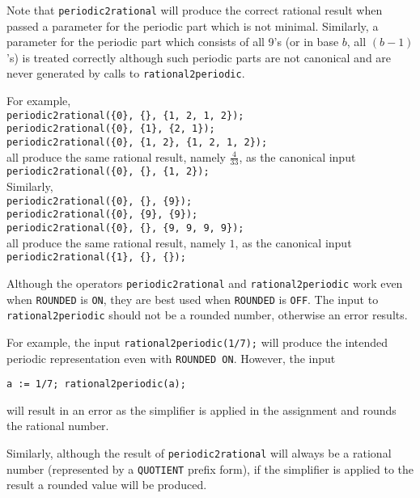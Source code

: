 \documentclass[11pt,a4paper]{article}
\begin{document}
Note that \texttt{periodic2rational} will produce the correct rational result
when passed a parameter for the periodic part which is not minimal.
Similarly, a parameter for the periodic part which consists of all 9's
(or in base $b$, all $(b-1)$'s) is treated correctly although such periodic
parts are not canonical and are never generated by calls to
\texttt{rational2periodic}.

\begin{tabbing}
For example,\\
\hspace{10mm} \= \texttt{periodic2rational(\{0\}, \{\}, \{1, 2, 1, 2\});} \\
    \> \texttt{periodic2rational(\{0\}, \{1\}, \{2, 1\});} \\
    \> \texttt{periodic2rational(\{0\}, \{1, 2\}, \{1, 2, 1, 2\});} \\[\baselineskip]
all produce the same rational result, namely $\frac{4}{33}$, as the canonical input\\
    \> \texttt{periodic2rational(\{0\}, \{\}, \{1, 2\});}\\[\baselineskip]
Similarly,\\
    \> \texttt{periodic2rational(\{0\}, \{\}, \{9\});} \\
    \> \texttt{periodic2rational(\{0\}, \{9\}, \{9\});} \\
    \> \texttt{periodic2rational(\{0\}, \{\}, \{9, 9, 9, 9\});} \\
all produce the same rational result, namely $1$, as the  canonical input\\
    \> \texttt{periodic2rational(\{1\}, \{\}, \{\});}
\end{tabbing}

Although the operators \texttt{periodic2rational} and \texttt{rational2periodic} work even when \texttt{ROUNDED} is \texttt{ON}, they
are best used when \texttt{ROUNDED} is \texttt{OFF}. The input
to \texttt{rational2periodic} should not be a rounded number, otherwise an error results.

For example, the input \texttt{rational2periodic(1/7);} will produce the
intended periodic representation even with \texttt{ROUNDED ON}. However,
 the input

\texttt{a := 1/7; rational2periodic(a);}

will result in an error as the simplifier is applied in the assignment and
rounds the rational number.

Similarly, although the result of \texttt{periodic2rational} will always be
a rational number (represented by a \texttt{QUOTIENT} prefix form), if the
simplifier is applied to the result a rounded value will be produced.
\end{document}
